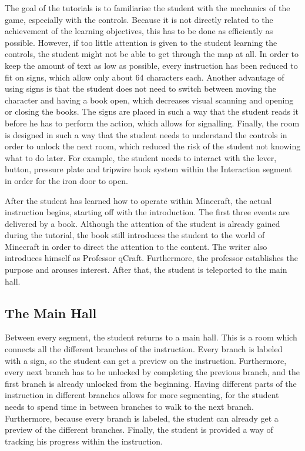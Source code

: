 \documentclass[11pt,twoside]{report} %
\begin{document}
The goal of the tutorials is to familiarise the student with the mechanics of the game, especially with the controls. Because it is not directly related to the achievement of the learning objectives, this has to be done as efficiently as possible. However, if too little attention is given to the student learning the controls, the student might not be able to get through the map at all. In order to keep the amount of text as low as possible, every instruction has been reduced to fit on signs, which allow only about 64 characters each. Another advantage of using signs is that the student does not need to switch between moving the character and having a book open, which decreases visual scanning and opening or closing the books. The signs are placed in such a way that the student reads it before he has to perform the action, which allows for signalling. Finally, the room is designed in such a way that the student needs to understand the controls in order to unlock the next room, which reduced the risk of the student not knowing what to do later. For example, the student needs to interact with the lever, button, pressure plate and tripwire hook system within the Interaction segment in order for the iron door to open.

After the student has learned how to operate within Minecraft, the actual instruction begins, starting off with the introduction. The first three events are delivered by a book. Although the attention of the student is already gained during the tutorial, the book still introduces the student to the world of Minecraft in order to direct the attention to the content. The writer also introduces himself as Professor qCraft. Furthermore, the professor establishes the purpose and arouses interest. After that, the student is teleported to the main hall.

\subsection{The Main Hall}

Between every segment, the student returns to a main hall. This is a room which connects all the different branches of the instruction. Every branch is labeled with a sign, so the student can get a preview on the instruction. Furthermore, every next branch has to be unlocked by completing the previous branch, and the first branch is already unlocked from the beginning. Having different parts of the instruction in different branches allows for more segmenting, for the student needs to spend time in between branches to walk to the next branch. Furthermore, because every branch is labeled, the student can already get a preview of the different branches. Finally, the student is provided a way of tracking his progress within the instruction.
\end{document}
